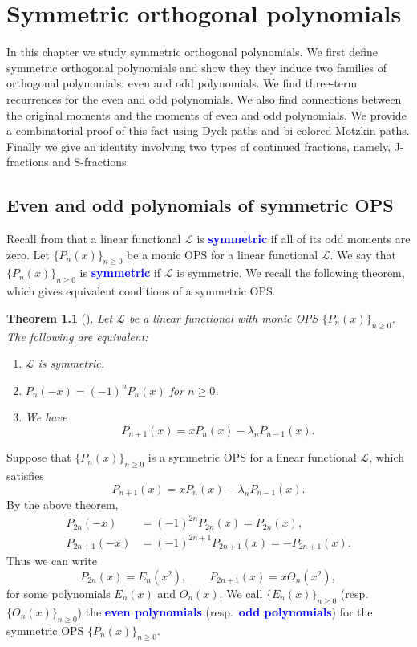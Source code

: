 \documentclass[oneside]{book}
\numberwithin{equation}{section}
\newtheorem{thm}{Theorem}[section]
\theoremstyle{definition}
\newcommand\LL{\mathcal{L}}
\renewcommand\emph[1]{\textcolor{blue}{\bf #1}}
\begin{document}
\chapter{Symmetric orthogonal polynomials}

In this chapter we study symmetric orthogonal polynomials. We first
define symmetric orthogonal polynomials and show they they induce two
families of orthogonal polynomials: even and odd polynomials. We find
three-term recurrences for the even and odd polynomials. We also find
connections between the original moments and the moments of even and
odd polynomials. We provide a combinatorial proof of this fact using
Dyck paths and bi-colored Motzkin paths. Finally we give an identity
involving two types of continued fractions, namely, J-fractions and
S-fractions.


\section{Even and odd polynomials of symmetric OPS}


Recall from  that a linear functional
\( \LL \) is \emph{symmetric} if all of its odd moments are zero. Let
\( \{ P_n(x) \}_{n\ge 0} \) be a monic OPS for a linear functional
\( \LL \). We say that \( \{ P_n(x) \}_{n\ge 0} \) is \emph{symmetric}
if \( \LL \) is symmetric. We recall the following theorem, which
gives equivalent conditions of a symmetric OPS.

\begin{thm}[]
  Let \( \LL \) be a linear functional with monic OPS
  \( \{ P_n(x) \}_{n\ge 0} \). The following are equivalent:
  \begin{enumerate}
  \item \( \LL \) is symmetric.
  \item \( P_n(-x) = (-1)^n P_n(x) \) for \( n\ge0 \).
  \item We have
    \[
      P_{n+1}(x) = x P_n(x) - \lambda_n P_{n-1}(x).
    \]
  \end{enumerate}
\end{thm}

Suppose that \( \{ P_n(x) \}_{n\ge 0} \) is a symmetric OPS for a
linear functional \( \LL \), which satisfies
\begin{equation}\label{eq:69}
  P_{n+1}(x) = x P_n(x) - \lambda_n P_{n-1}(x).
\end{equation}
By the above theorem, 
\begin{align*}
  P_{2n}(-x) &= (-1)^{2n} P_{2n}(x) = P_{2n}(x),\\
  P_{2n+1}(-x) &= (-1)^{2n+1} P_{2n+1}(x) = -P_{2n+1}(x).
\end{align*}
Thus we can write
\[
  P_{2n}(x) = E_n(x^2), \qquad P_{2n+1}(x) = xO_n(x^2),
\]
for some polynomials \( E_n(x) \) and \( O_n(x) \). We call
\( \{E_n(x)\}_{n\ge0} \) (resp.~\( \{O_n(x)\}_{n\ge0} \)) the
\emph{even polynomials} (resp.~\emph{odd polynomials}) for the
symmetric OPS \( \{ P_n(x) \}_{n\ge 0} \).
\end{document}
